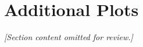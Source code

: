 \chapter{Additional Plots}
\label{app:additional_plots}

\textit{[Section content omitted for review.]}
